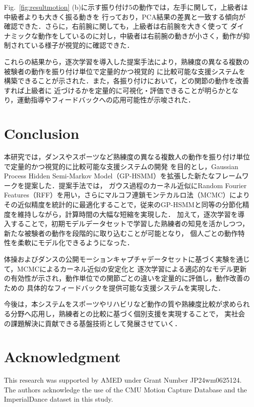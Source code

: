 \documentclass[conference]{IEEEtran}
\begin{document}
Fig.~\ref{fig:resultmotion} (b)に示す振り付け5の動作では，左手に関して，上級者は中級者よりも大きく振る動きを
行っており，PCA結果の差異と一致する傾向が確認できた．さらに，右前腕に関しても，上級者は右前腕を大きく使って
ダイナミックな動作をしているのに対し，中級者は右前腕の動きが小さく，動作が抑制されている様子が視覚的に確認できた．

これらの結果から，逐次学習を導入した提案手法により，熟練度の異なる複数の被験者の動作を振り付け単位で定量的かつ視覚的
に比較可能な支援システムを構築できることが示された．また，各振り付けにおいて，どの関節の動作を改善すれば上級者に
近づけるかを定量的に可視化・評価できることが明らかとなり，運動指導やフィードバックへの応用可能性が示唆された．

\section{Conclusion}
本研究では，ダンスやスポーツなど熟練度の異なる複数人の動作を振り付け単位で定量的かつ視覚的に比較可能な支援システムの開発
を目的とし，Gaussian Process Hidden Semi-Markov Model（GP-HSMM）を拡張した新たなフレームワークを提案した．提案手法では，
ガウス過程のカーネル近似にRandom Fourier Features（RFF）を用い，さらにマルコフ連鎖モンテカルロ法（MCMC）により
その近似精度を統計的に最適化することで，従来のGP-HSMMと同等の分節化精度を維持しながら，計算時間の大幅な短縮を実現した．
加えて，逐次学習を導入することで，初期モデルデータセットで学習した熟練者の知見を活かしつつ，新たな被験者の動作を段階的に取り込むことが可能となり，
個人ごとの動作特性を柔軟にモデル化できるようになった．

体操およびダンスの公開モーションキャプチャデータセットに基づく実験を通じて，MCMCによるカーネル近似の安定化と
逐次学習による適応的なモデル更新の有効性が示され，動作単位での関節ごとの違いを定量的に評価し，動作改善のための
具体的なフィードバックを提供可能な支援システムを実現した．

今後は，本システムをスポーツやリハビリなど動作の質や熟練度比較が求められる分野へ応用し，熟練者との比較に基づく個別支援を実現することで，
実社会の課題解決に貢献できる基盤技術として発展させていく．

\section*{Acknowledgment}
This research was supported by AMED under Grant Number JP24wm0625124.  
The authors acknowledge the use of the CMU Motion Capture Database and the ImperialDance dataset in this study.
\end{document}

